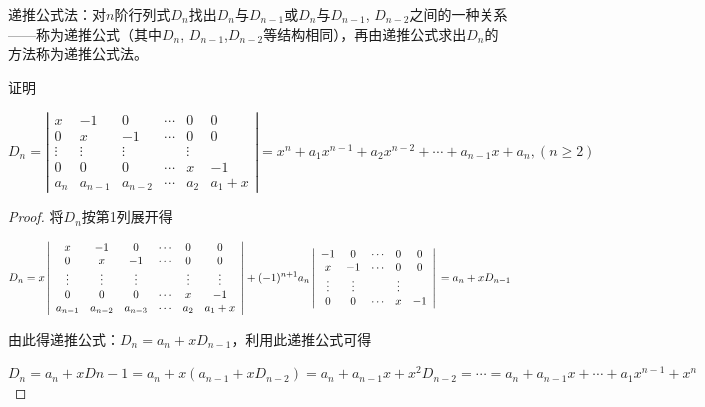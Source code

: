 递推公式法：对$n$阶行列式$D_{n}$找出$D_{n}$与$D_{n-1}$或$D_{n}$与$D_{n-1}$, $D_{n-2}$之间的一种关系——称为递推公式（其中$D_{n}$, $D_{n-1}$,$D_{n-2}$等结构相同），再由递推公式求出$D_{n}$的方法称为递推公式法。

\begin{example}
    证明

$$D_{n}=\left|\begin{array}{cccccc}
        x      & -1      & 0       & \cdots & 0      & 0       \\
        0      & x       & -1      & \cdots & 0      & 0       \\
        \vdots & \vdots  & \vdots  &        & \vdots           \\
        0      & 0       & 0       & \cdots & x      & -1      \\
        a_{n}  & a_{n-1} & a_{n-2} & \cdots & a_{2}  & a_{1}+x
    \end{array}\right|
    =x^{n}+a_{1}x^{n-1}+a_{2}x^{n-2}+\cdots+a_{n-1}x+a_{n},(n\ge 2)
$$
\end{example}

\begin{proof}
    将$D_{n}$按第1列展开得

$$D_{n}=x\left|\begin{array}{cccccc}
        x       & -1      & 0       & \cdots & 0      & 0       \\
        0       & x       & -1      & \cdots & 0      & 0       \\
        \vdots  & \vdots  & \vdots  &        & \vdots & \vdots  \\
        0       & 0       & 0       & \cdots & x      & -1      \\
        a_{n-1} & a_{n-2} & a_{n-3} & \cdots & a_{2}  & a_{1}+x
    \end{array}\right| +
    (-1)^{n+1}a_{n}\left|\begin{array}{cccccc}
        -1     & 0      & \cdots & 0      & 0  \\
        x      & -1     & \cdots & 0      & 0  \\
        \vdots & \vdots &        & \vdots      \\
        0      & 0      & \cdots & x      & -1
    \end{array}\right| \\
    =a_{n}+xD_{n-1}
$$

由此得递推公式：$D_{n}=a_{n}+xD_{n-1}$，利用此递推公式可得

$D_{n}=a_{n}+xD{n-1}=a_{n}+x(a_{n-1}+xD_{n-2})=a_{n}+a_{n-1}x+x^{2}D_{n-2}=\cdots=a_{n}+a_{n-1}x+\cdots+a_{1}x^{n-1}+x^{n}
$
\end{proof}

